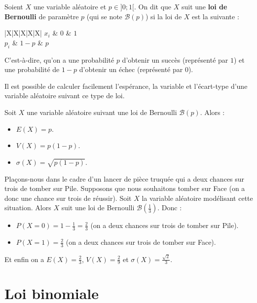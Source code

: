 	\begin{formula}[Définition]
		Soient $X$ une variable aléatoire et $p \in ]0; 1[$. On dit que $X$ suit une \textbf{loi de Bernoulli} de paramètre $p$ (qui se note $\mathcal{B}(p)$) si la loi de $X$ est la suivante :
		\newpar
    \begin{whitetabularx}{|X|X|X|X|X|}
				\hline
				$x_i$ & $0$ & $1$ \\
				\hline
				$p_i$ & $1 - p$ & $p$ \\
				\hline
    \end{whitetabularx}
		\newpar
		C'est-à-dire, qu'on a une probabilité $p$ d'obtenir un succès (représenté par $1$) et une probabilité de $1-p$ d'obtenir un échec (représenté par $0$).
	\end{formula}

	Il est possible de calculer facilement l'espérance, la variable et l'écart-type d'une variable aléatoire suivant ce type de loi.

	\begin{formula}
		Soit $X$ une variable aléatoire suivant une loi de Bernoulli $\mathcal{B}(p)$. Alors :
		\begin{itemize}
			\item $E(X) = p$.
			\item $V(X) = p(1-p)$.
			\item $\sigma(X) = \sqrt{p(1-p)}$.
		\end{itemize}
	\end{formula}

	\begin{tip}[Exemple]
		Plaçons-nous dans le cadre d'un lancer de pièce truquée qui a deux chances sur trois de tomber sur Pile. Supposons que nous souhaitons tomber sur Face (on a donc une chance sur trois de réussir).
		\newpar
		Soit $X$ la variable aléatoire modélisant cette situation. Alors $X$ suit une loi de Bernoulli $\mathcal{B}\left(\frac{1}{3}\right)$. Donc :
		\begin{itemize}
			\item $P(X = 0) = 1 - \frac{1}{3} = \frac{2}{3}$ (on a deux chances sur trois de tomber sur Pile).
			\item $P(X = 1) = \frac{2}{3}$ (on a deux chances sur trois de tomber sur Face).
		\end{itemize}
		Et enfin on a $E(X) = \frac{2}{3}$, $V(X) = \frac{2}{9}$ et $\sigma(X) = \frac{\sqrt{2}}{3}$.
	\end{tip}

	\section{Loi binomiale}

